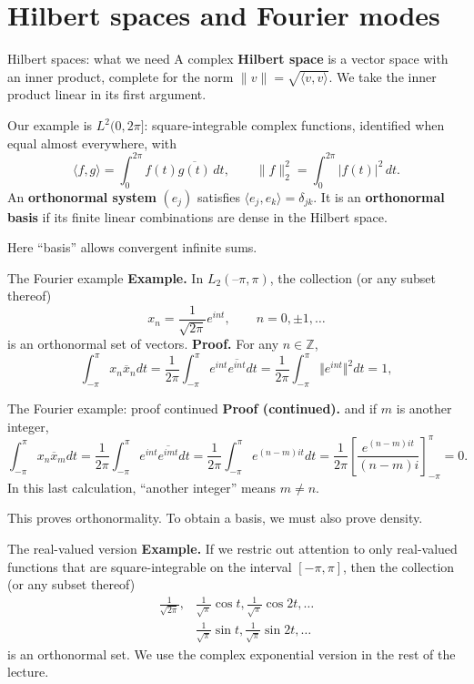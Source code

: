 \documentclass[aspectratio=169,11pt]{beamer}
\newcommand{\Z}{\mathbb Z}
\begin{document}
\section{Hilbert spaces and Fourier modes}
\begin{frame}{Hilbert spaces: what we need}
A complex \textbf{Hilbert space} is a vector space with an inner product,
complete for the norm $\|v\|=\sqrt{\langle v,v\rangle}$.
We take the inner product linear in its first argument.

Our example is $L^2(0,2\pi]$: square-integrable complex functions,
identified when equal almost everywhere, with
\[
 \langle f,g\rangle=\int_0^{2\pi}f(t)\overline{g(t)}\,dt,
 \qquad \|f\|_2^2=\int_0^{2\pi}|f(t)|^2\,dt.
\]
An \textbf{orthonormal system} $(e_j)$ satisfies
$\langle e_j,e_k\rangle=\delta_{jk}$.
It is an \textbf{orthonormal basis} if its finite linear combinations
are dense in the Hilbert space.

Here ``basis'' allows convergent infinite sums.
\end{frame}

\begin{frame}{The Fourier example}
\textbf{Example.}
In $L_2(–\pi,\pi)$, the collection (or any subset thereof)
			\[x_n=\frac{1}{\sqrt{2\pi}}e^{int},\qquad n=0,\pm1,\ldots\]
			is an orthonormal set of vectors.
\textbf{Proof.}
For any $n\in\Z$,
				\[\int_{-\pi}^\pi x_n\overline{x}_ndt=\frac{1}{2\pi}\int_{-\pi}^\pi e^{int}\overline{e^{int}}dt=\frac{1}{2\pi}\int_{-\pi}^\pi \Vert e^{int}\Vert^2dt=1,\]
\end{frame}

\begin{frame}{The Fourier example: proof continued}
\textbf{Proof (continued).}
\begingroup\small
and if $m$ is another integer,
				\[\int_{-\pi}^\pi x_n\overline{x}_mdt=\frac{1}{2\pi}\int_{-\pi}^\pi e^{int}\overline{e^{imt}}dt=\frac{1}{2\pi}\int_{-\pi}^\pi e^{(n-m)it}dt=\frac{1}{2\pi}\left[\frac{e^{(n-m)it}}{(n-m)i}\right]_{-\pi}^\pi=0.\]
\endgroup
\medskip
In this last calculation, ``another integer'' means $m\ne n$.

This proves orthonormality. To obtain a basis, we must also prove density.
\end{frame}

\begin{frame}{The real-valued version}
\textbf{Example.}
If we restric out attention to only real-valued functions that are square-integrable on the interval $[-\pi,\pi]$, then the collection (or any subset thereof)
			\begin{align*}
				\frac{1}{\sqrt{2\pi}},&\frac{1}{\sqrt{\pi}}\cos t,\frac{1}{\sqrt{\pi}}\cos 2t,\ldots\\
				&\frac{1}{\sqrt{\pi}}\sin t,\frac{1}{\sqrt{\pi}}\sin 2t,\ldots
			\end{align*}
			is an orthonormal set.
\medskip
We use the complex exponential version in the rest of the lecture.
\end{frame}
\end{document}
